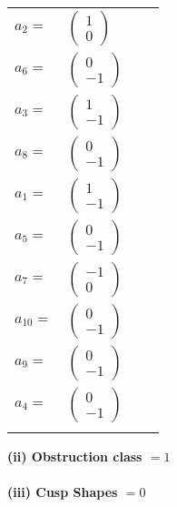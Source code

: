 \documentclass[1p]{elsarticle_modified}
\theoremstyle{definition}
\begin{document}
\begin{tabular}{m{7pt} m{180pt} m{7pt} m{180pt} }
\flushright $a_{2}=$&$\begin{pmatrix}1\\0\end{pmatrix}$ \\
\flushright $a_{6}=$&$\begin{pmatrix}0\\-1\end{pmatrix}$ \\
\flushright $a_{3}=$&$\begin{pmatrix}1\\-1\end{pmatrix}$ \\
\flushright $a_{8}=$&$\begin{pmatrix}0\\-1\end{pmatrix}$ \\
\flushright $a_{1}=$&$\begin{pmatrix}1\\-1\end{pmatrix}$ \\
\flushright $a_{5}=$&$\begin{pmatrix}0\\-1\end{pmatrix}$ \\
\flushright $a_{7}=$&$\begin{pmatrix}-1\\0\end{pmatrix}$ \\
\flushright $a_{10}=$&$\begin{pmatrix}0\\-1\end{pmatrix}$ \\
\flushright $a_{9}=$&$\begin{pmatrix}0\\-1\end{pmatrix}$ \\
\flushright $a_{4}=$&$\begin{pmatrix}0\\-1\end{pmatrix}$\\&\end{tabular}
\flushleft \textbf{(ii) Obstruction class $= 1$}\\~\\
\flushleft \textbf{(iii) Cusp Shapes $= 0$}\\~\\
\end{document}
